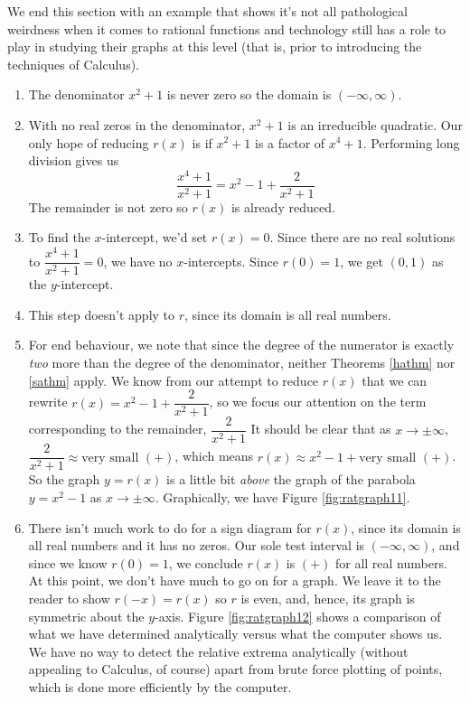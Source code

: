 \medskip

We end this section with an example that shows it's not all pathological weirdness when it comes to rational functions and technology still has a role to play in studying their graphs at this level (that is, prior to introducing the techniques of Calculus).

\medskip

{
\begin{enumerate}

\item  The denominator $x^2+1$ is never zero so the domain is $(-\infty, \infty)$.

\item  With no real zeros in the denominator, $x^2+1$ is an irreducible quadratic.  Our only hope of reducing $r(x)$ is if $x^2+1$ is a factor of $x^4+1$.  Performing long division gives us \[\dfrac{x^4+1}{x^2+1} = x^2-1+\dfrac{2}{x^2+1}\] The remainder is not zero so $r(x)$ is already reduced.

\item  To find the $x$-intercept, we'd set $r(x) = 0$.  Since there are no real solutions to $\dfrac{x^4+1}{x^2+1}=0$, we have no $x$-intercepts.  Since $r(0) = 1$, we get $(0,1)$ as the $y$-intercept.

\item  This step doesn't apply to $r$, since its domain is all real numbers.

\item  For end behaviour, we note that since the degree of the numerator is exactly \textit{two} more than the degree of the denominator, neither Theorems \ref{hathm} nor \ref{sathm} apply. We know from our attempt to reduce $r(x)$ that we can rewrite $r(x) = x^2-1+\dfrac{2}{x^2+1}$, so we focus our attention on the term corresponding to the remainder, $\dfrac{2}{x^2+1}$  It should be clear that as $x \rightarrow \pm \infty$, $\dfrac{2}{x^2+1} \approx \mbox{very small $(+)$}$, which means $r(x) \approx x^2-1 + \mbox{very small $(+)$}$.  So the graph $y=r(x)$ is a little bit \textit{above} the graph of the parabola $y=x^2-1$ as $x \rightarrow \pm \infty$. Graphically, we have Figure \ref{fig:ratgraph11}.



\item  There isn't much work to do for a sign diagram for $r(x)$, since its domain is all real numbers and it has no zeros.  Our sole test interval is $(-\infty, \infty)$, and since we know $r(0) = 1$, we conclude $r(x)$ is $(+)$ for all real numbers. At this point, we don't have much to go on for a graph.  We leave it to the reader to show $r(-x) = r(x)$ so $r$ is even, and, hence, its graph is symmetric about the $y$-axis. Figure \ref{fig:ratgraph12} shows a comparison of what we have determined analytically versus what the computer shows us.  We have no way to detect the relative extrema analytically (without appealing to Calculus, of course) apart from brute force plotting of points, which is done more efficiently by the computer.


\end{enumerate}}

